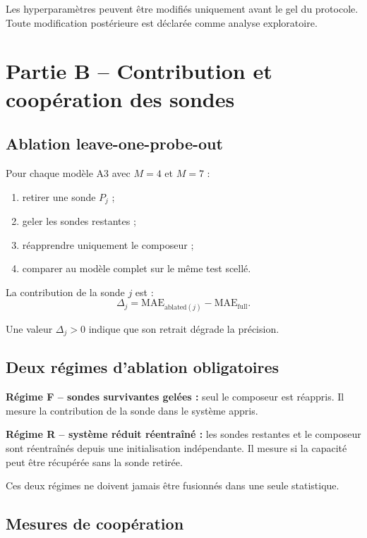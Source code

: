 \documentclass[11pt,a4paper]{article}
\newcommand{\MAE}{\mathrm{MAE}}
\begin{document}
Les hyperparamètres peuvent être modifiés uniquement avant le gel du
protocole. Toute modification postérieure est déclarée comme analyse
exploratoire.

\section{Partie B -- Contribution et coopération des sondes}

\subsection{Ablation leave-one-probe-out}

Pour chaque modèle A3 avec $M=4$ et $M=7$ :
\begin{enumerate}
  \item retirer une sonde $P_j$ ;
  \item geler les sondes restantes ;
  \item réapprendre uniquement le composeur ;
  \item comparer au modèle complet sur le même test scellé.
\end{enumerate}

La contribution de la sonde $j$ est :
\[
\Delta_j=
\MAE_{\mathrm{ablated}(j)}
-
\MAE_{\mathrm{full}}.
\]

Une valeur $\Delta_j>0$ indique que son retrait dégrade la précision.

\subsection{Deux régimes d'ablation obligatoires}

\textbf{Régime F -- sondes survivantes gelées :}
seul le composeur est réappris. Il mesure la contribution de la sonde
dans le système appris.

\textbf{Régime R -- système réduit réentraîné :}
les sondes restantes et le composeur sont réentraînés depuis une
initialisation indépendante. Il mesure si la capacité peut être
récupérée sans la sonde retirée.

Ces deux régimes ne doivent jamais être fusionnés dans une seule
statistique.

\subsection{Mesures de coopération}
\end{document}
